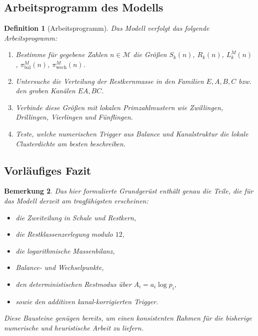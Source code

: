 \documentclass[11pt,a4paper]{article}
\newtheorem{definition}{Definition}[section]
\newtheorem{bemerkung}[definition]{Bemerkung}
\begin{document}
	\subsection{Arbeitsprogramm des Modells}
	
	\begin{definition}[Arbeitsprogramm]
		\label{def:arbeitsprogramm}
		Das Modell verfolgt das folgende Arbeitsprogramm:
		\begin{enumerate}
			\item Bestimme für gegebene Zahlen \(n\in\mathcal M\) die Größen \(S_k(n)\), \(R_k(n)\), \(L_k^M(n)\), \(\pi_{\text{bal}}^M(n)\), \(\pi_{\text{wech}}^M(n)\).
			\item Untersuche die Verteilung der Restkernmasse in den Familien \(E,A,B,C\) bzw. den groben Kanälen \(EA,BC\).
			\item Verbinde diese Größen mit lokalen Primzahlmustern wie Zwillingen, Drillingen, Vierlingen und Fünflingen.
			\item Teste, welche numerischen Trigger aus Balance und Kanalstruktur die lokale Clusterdichte am besten beschreiben.
		\end{enumerate}
	\end{definition}
	
	\subsection{Vorläufiges Fazit}
	
	\begin{bemerkung}
		Das hier formulierte Grundgerüst enthält genau die Teile, die für das Modell derzeit am tragfähigsten erscheinen:
		
		\begin{itemize}
			\item die Zweiteilung in Schale und Restkern,
			\item die Restklassenzerlegung modulo \(12\),
			\item die logarithmische Massenbilanz,
			\item Balance- und Wechselpunkte,
			\item den deterministischen Restmodus über \(A_i=a_i\log p_i\),
			\item sowie den additiven kanal-korrigierten Trigger.
		\end{itemize}
		
		Diese Bausteine genügen bereits, um einen konsistenten Rahmen für die bisherige numerische und heuristische Arbeit zu liefern.
	\end{bemerkung}
	
\end{document}

